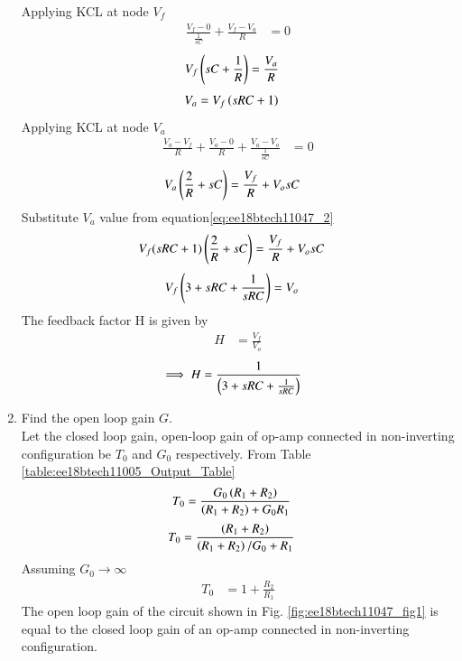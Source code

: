 \begin{enumerate}[label=\arabic*.,ref=\theenumi]
Applying KCL at node $V_f$
\begin{align}
\frac{V_{f} - 0}{\frac{1}{sC}} +\frac{V_{f} - V_{a}}{R} &= 0
\end{align}
\begin{align}
V_{f}\left(sC+\frac{1}{R}\right) &= \frac{V_{a}}{R} 
\end{align}
\begin{align}
\label{eq:ee18btech11047_2}
V_{a} &= V_{f}\brak{sRC + 1} 
\end{align}
Applying KCL at node $V_{a}$
\begin{align}
\frac{V_{a} - V_{f}}{R} + \frac{V_{a} - 0}{R} + \frac{V_{a} - V_{o}}{\frac{1}{sC}} &= 0
\end{align}
\begin{align}
V_{a}\left(\frac{2}{R} +sC\right) &= \frac{V_{f}}{R} + V_{o}sC
\end{align}
Substitute $V_{a}$ value from equation\eqref{eq:ee18btech11047_2}
\begin{align}
V_{f}(sRC + 1)\left(\frac{2}{R} + sC\right) &= \frac{V_{f}}{R} + V_{o}sC
\end{align}
\begin{align}
V_{f}\left(3 + sRC + \frac{1}{sRC}\right) &= V_{o}
\end{align}
The feedback factor H is given by 
\begin{align}
H &= \frac{V_{f}}{V_{o}}
\end{align}
\begin{align}
\label{eq:ee18btech11047_3}
\implies H &= \frac{1}{\brak{3+sRC +\frac{1}{sRC}}}
\end{align}
\item Find the open loop gain $G$.\\
\label{prob:ee18btech11047_G}
\solution Let the closed loop gain, open-loop gain of op-amp connected in non-inverting configuration be $T_{0}$ and $G_{0}$ respectively.
From Table \ref{table:ee18btech11005_Output_Table}
\begin{align}
T_{0} &= \frac{G_{0}\left(R_1+R_2\right)}{\left(R_1+R_2\right)+G_{0}R_1}
\end{align}
\begin{align}
T_{0} &= \frac{\left(R_1+R_2\right)}{\left(R_1+R_2\right)/G_{0}+R_1}
\end{align}
Assuming $G_{0}\to\infty$
\begin{align}
T_{0} &= 1 + \frac{R_{2}}{R_{1}}
\end{align}
The open loop gain of the circuit shown in Fig. \ref{fig:ee18btech11047_fig1} is equal to the closed loop gain of an op-amp connected in non-inverting configuration.

\end{enumerate}
